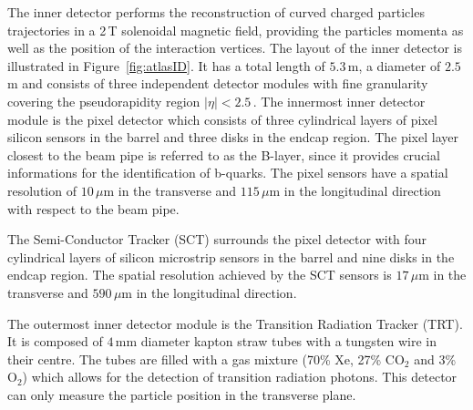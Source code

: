 The inner detector performs the reconstruction  of curved charged particles trajectories in a 2\,T solenoidal magnetic field,
providing the particles momenta as well as the position of the interaction vertices. 
The layout of the inner detector is illustrated in Figure~\ref{fig:atlasID}.
It has a total length of $5.3\,$m, a diameter of $2.5\,$m and consists
 of three independent detector modules with fine granularity
covering the pseudorapidity region $|\eta| < 2.5\,.$ The innermost inner detector module is the pixel detector
which consists of three cylindrical layers of pixel silicon sensors in the barrel and three disks in the endcap region. 
The pixel layer closest to the beam pipe is
referred to as the B-layer, since it provides crucial informations for the identification of b-quarks. 
The pixel sensors have a spatial resolution of  $10\,\mu$m in the transverse and $115\,\mu$m in the longitudinal
direction with respect to the beam pipe.

The Semi-Conductor Tracker (SCT) surrounds the pixel detector with four cylindrical layers of silicon microstrip sensors in the barrel
and nine disks in the  endcap region. The spatial resolution achieved by the SCT sensors is $17\,\mu$m in the transverse and $590\,\mu$m 
in the longitudinal direction.

The outermost inner detector module is the Transition Radiation Tracker (TRT). It is composed of $4\,$mm diameter kapton straw tubes
with a tungsten wire in their centre. The tubes are filled with a gas mixture (70\% Xe, 27\% CO$_2$
and 3\% $\text{O}_2$) which allows for the detection of transition 
radiation photons. This detector can only measure the particle position in the transverse plane.

